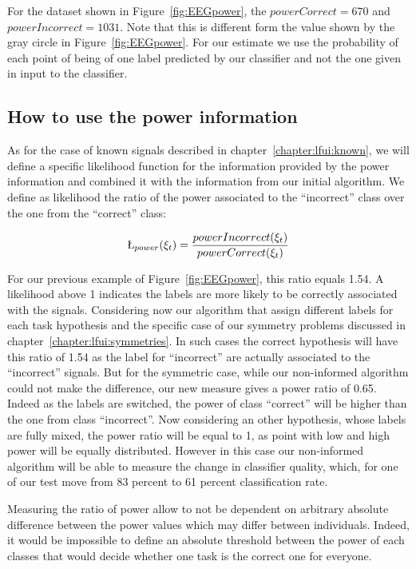 For the dataset shown in Figure~\ref{fig:EEGpower}, the $powerCorrect = 670$ and $powerIncorrect = 1031$. Note that this is different form the value shown by the gray circle in Figure~\ref{fig:EEGpower}. For our estimate we use the probability of each point of being of one label predicted by our classifier and not the one given in input to the classifier. 

\subsection{How to use the power information}

As for the case of known signals described in chapter~\ref{chapter:lfui:known}, we will define a specific likelihood function for the information provided by the power information and combined it with the information from our initial algorithm. We define as likelihood the ratio of the power associated to the ``incorrect'' class over the one from the ``correct'' class:

\begin{eqnarray}
\L_{power}(\xi_t) = \frac{powerIncorrect(\xi_t)}{powerCorrect(\xi_t)}
\label{eq:power}
\end{eqnarray}

For our previous example of Figure~\ref{fig:EEGpower}, this ratio equals 1.54. A likelihood above 1 indicates the labels are more likely to be correctly associated with the signals. Considering now our algorithm that assign different labels for each task hypothesis and the specific case of our symmetry problems discussed in chapter~\ref{chapter:lfui:symmetries}. In such cases the correct hypothesis will have this ratio of 1.54 as the label for ``incorrect'' are actually associated to the ``incorrect'' signals. But for the symmetric case, while our non-informed algorithm could not make the difference, our new measure gives a power ratio of 0.65. Indeed as the labels are switched, the power of class ``correct'' will be higher than the one from class ``incorrect''. Now considering an other hypothesis, whose labels are fully mixed, the power ratio will be equal to 1, as point with low and high power will be equally distributed. However in this case our non-informed algorithm will be able to measure the change in classifier quality, which, for one of our test move from 83 percent to 61 percent classification rate.

Measuring the ratio of power allow to not be dependent on arbitrary absolute difference between the power values which may differ between individuals. Indeed, it would be impossible to define an absolute threshold between the power of each classes that would decide whether one task is the correct one for everyone. 

